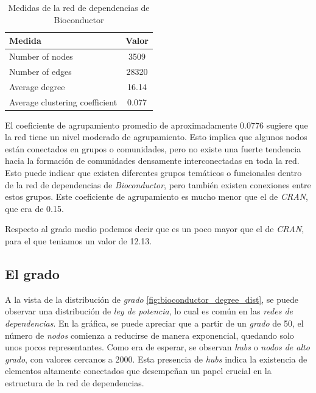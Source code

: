\begin{table}[ht!]
    \begin{center}
        \begin{tabular}{|l|c|}
            \hline
            \textbf{Medida}                & \textbf{Valor} \\
            \hline
            Number of nodes                & 3509           \\
            Number of edges                & 28320          \\
            Average degree                 & 16.14          \\
            Average clustering coefficient & 0.077          \\
            \hline
        \end{tabular}
        \caption{Medidas de la red de dependencias de Bioconductor}
        \label{tab:Medidas de la red de dependencias de Bioconductor}
    \end{center}
\end{table}

El coeficiente de agrupamiento promedio de aproximadamente 0.0776 sugiere que la red tiene un nivel moderado de agrupamiento.
Esto implica que algunos nodos están conectados en grupos o comunidades, pero no existe una fuerte tendencia hacia la formación
de comunidades densamente interconectadas en toda la red. Esto puede indicar que existen diferentes grupos temáticos o
funcionales dentro de la red de dependencias de \textit{Bioconductor}, pero también existen conexiones entre estos grupos.
Este coeficiente de agrupamiento es mucho menor que el de \textit{CRAN}, que era de 0.15.

Respecto al grado medio podemos decir que es un poco mayor que el de \textit{CRAN},
para el que teniamos un valor de 12.13.

\subsection{El grado}

A la vista de la distribución de \emph{grado} \ref{fig:bioconductor_degree_dist}, se puede observar una distribución
de \emph{ley de potencia}, lo cual es común en las \emph{redes de dependencias}.
En la gráfica, se puede apreciar que a partir de un \emph{grado} de 50, el
número de \emph{nodos} comienza a reducirse de manera exponencial, quedando
solo unos pocos representantes. Como era de esperar, se observan \emph{hubs}
o \emph{nodos de alto grado}, con valores cercanos a 2000. Esta presencia
de \emph{hubs} indica la existencia de elementos altamente conectados que
desempeñan un papel crucial en la estructura de la red de dependencias.

